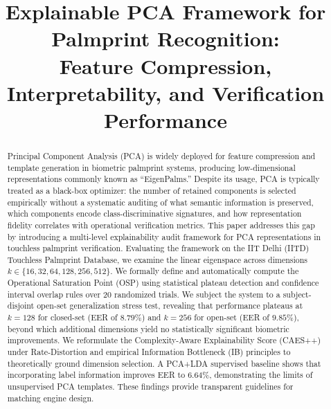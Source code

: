 \documentclass[conference]{IEEEtran}
\begin{document}
\title{Explainable PCA Framework for Palmprint Recognition:\\Feature Compression, Interpretability, and Verification Performance}

\author{
}

\maketitle

\begin{abstract}
Principal Component Analysis (PCA) is widely deployed for feature compression and template generation in biometric palmprint systems, producing low-dimensional representations commonly known as ``EigenPalms.'' Despite its usage, PCA is typically treated as a black-box optimizer: the number of retained components is selected empirically without a systematic auditing of what semantic information is preserved, which components encode class-discriminative signatures, and how representation fidelity correlates with operational verification metrics. This paper addresses this gap by introducing a multi-level explainability audit framework for PCA representations in touchless palmprint verification. Evaluating the framework on the IIT Delhi (IITD) Touchless Palmprint Database, we examine the linear eigenspace across dimensions $k \in \{16, 32, 64, 128, 256, 512\}$. We formally define and automatically compute the Operational Saturation Point (OSP) using statistical plateau detection and confidence interval overlap rules over 20 randomized trials. We subject the system to a subject-disjoint open-set generalization stress test, revealing that performance plateaus at $k{=}128$ for closed-set (EER of $8.79\%$) and $k{=}256$ for open-set (EER of $9.85\%$), beyond which additional dimensions yield no statistically significant biometric improvements. We reformulate the Complexity-Aware Explainability Score (CAES++) under Rate-Distortion and empirical Information Bottleneck (IB) principles to theoretically ground dimension selection. A PCA+LDA supervised baseline shows that incorporating label information improves EER to $6.64\%$, demonstrating the limits of unsupervised PCA templates. These findings provide transparent guidelines for matching engine design.
\end{abstract}
\end{document}
